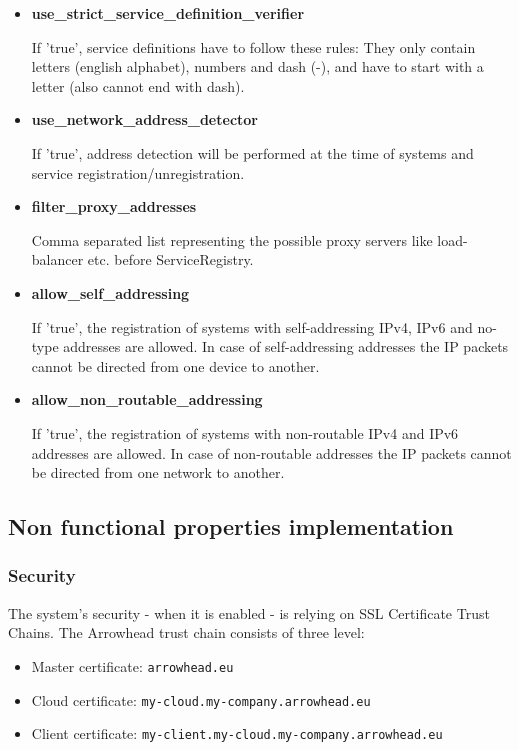 \documentclass[a4paper]{arrowhead}
\begin{document}
\begin{itemize}
    \item \textbf{use\_strict\_service\_definition\_verifier}
  
    If 'true', service definitions have to follow these rules: They only contain letters (english alphabet), numbers and dash (-), and have to start with a letter (also cannot end with dash).
    
    \item \textbf{use\_network\_address\_detector}
  
    If 'true', address detection will be performed at the time of systems and service registration/unregistration.
    
    \item \textbf{filter\_proxy\_addresses}
  
    Comma separated list representing the possible proxy servers like load-balancer etc. before ServiceRegistry.
    
    \item \textbf{allow\_self\_addressing}
  
    If 'true', the registration of systems with self-addressing IPv4, IPv6 and no-type addresses are allowed. In case of self-addressing addresses the IP packets cannot be directed from one device to another.
    
    \item \textbf{allow\_non\_routable\_addressing}
  
    If 'true', the registration of systems with non-routable IPv4 and IPv6 addresses are allowed. In case of non-routable addresses the IP packets cannot be directed from one network to another.
\end{itemize}

\clearpage

\subsection {Non functional properties implementation}

\subsubsection {Security}

The system's security - when it is enabled - is relying on SSL Certificate Trust Chains. The Arrowhead trust chain consists of three level:

\begin{itemize}
    \item Master certificate: \texttt{arrowhead.eu}
    \item Cloud certificate: \texttt{my-cloud.my-company.arrowhead.eu}
    \item Client certificate: \texttt{my-client.my-cloud.my-company.arrowhead.eu}
\end{itemize}
\end{document}
